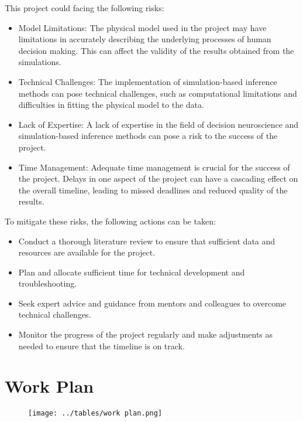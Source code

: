 This project could facing the following risks:
\begin{itemize}
  \item Model Limitations: The physical model used in the project may have limitations in accurately describing the underlying processes of human decision making. This can affect the validity of the results obtained from the simulations.
  \item Technical Challenges: The implementation of simulation-based inference methods can pose technical challenges, such as computational limitations and difficulties in fitting the physical model to the data.
  \item Lack of Expertise: A lack of expertise in the field of decision neuroscience and simulation-based inference methods can pose a risk to the success of the project.
  \item Time Management: Adequate time management is crucial for the success of the project. Delays in one aspect of the project can have a cascading effect on the overall timeline, leading to missed deadlines and reduced quality of the results.
\end{itemize}


To mitigate these risks, the following actions can be taken:

\begin{itemize}
  \item Conduct a thorough literature review to ensure that sufficient data and resources are available for the project.
  \item Plan and allocate sufficient time for technical development and troubleshooting.
  \item Seek expert advice and guidance from mentors and colleagues to overcome technical challenges.
  \item Monitor the progress of the project regularly and make adjustments as needed to ensure that the timeline is on track.
\end{itemize}


\section{Work Plan}
\begin{figure}[!htbp]
  \centering
  \texttt{[image: ../tables/work plan.png]}
  \label{fig: work plan}
\end{figure}